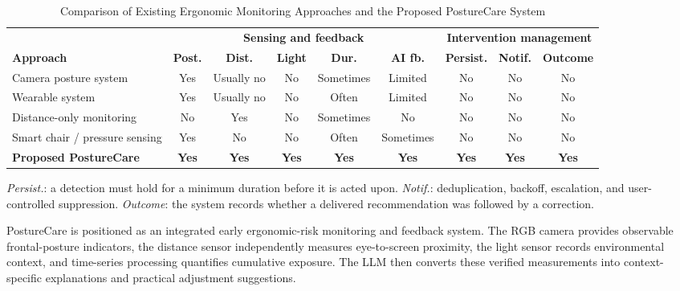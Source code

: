 \begin{table}[htbp]
\caption{Comparison of Existing Ergonomic Monitoring Approaches and the Proposed PostureCare System}
\label{tab:approach_comparison}
\centering
\small
\begin{tabular}{@{}lcccccccc@{}}
\toprule
& \multicolumn{5}{c}{\textbf{Sensing and feedback}} & \multicolumn{3}{c}{\textbf{Intervention management}} \\
\cmidrule(lr){2-6} \cmidrule(l){7-9}
\textbf{Approach} & \textbf{Post.} & \textbf{Dist.} & \textbf{Light} & \textbf{Dur.} & \textbf{AI fb.}
& \textbf{Persist.} & \textbf{Notif.} & \textbf{Outcome} \\
\midrule
Camera posture system          & Yes & Usually no & No  & Sometimes & Limited   & No & No & No \\
Wearable system                & Yes & Usually no & No  & Often     & Limited   & No & No & No \\
Distance-only monitoring       & No  & Yes        & No  & Sometimes & No        & No & No & No \\
Smart chair / pressure sensing & Yes & No         & No  & Often     & Sometimes & No & No & No \\
\textbf{Proposed PostureCare}  & \textbf{Yes} & \textbf{Yes} & \textbf{Yes} & \textbf{Yes} & \textbf{Yes}
& \textbf{Yes} & \textbf{Yes} & \textbf{Yes} \\
\bottomrule
\end{tabular}
\par\medskip
\footnotesize
\begin{minipage}{0.95\linewidth}
\textit{Persist.}: a detection must hold for a minimum duration before it is acted upon.
\textit{Notif.}: deduplication, backoff, escalation, and user-controlled suppression.
\textit{Outcome}: the system records whether a delivered recommendation was followed by a correction.
\end{minipage}
\end{table}

PostureCare is positioned as an integrated early ergonomic-risk monitoring and feedback system. The RGB camera provides observable frontal-posture indicators, the distance sensor independently measures eye-to-screen proximity, the light sensor records environmental context, and time-series processing quantifies cumulative exposure. The LLM then converts these verified measurements into context-specific explanations and practical adjustment suggestions.

